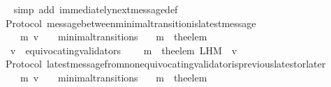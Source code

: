 \begin{isabellebody}
\ \ \isamarkupfalse%
\ {\isacharparenleft}simp\ add{\isacharcolon}\ immediately{\isacharunderscore}next{\isacharunderscore}message{\isacharunderscore}def{\isacharparenright}\ \ \isanewline
\ \ \isamarkupfalse%
%
\endisatagproof
{\isafoldproof}%
%
\isadelimproof
\isanewline
%
\endisadelimproof
\isanewline
\isanewline
{}\isamarkupfalse%
\ {\isacharparenleft}\ Protocol{\isacharparenright}\ message{\isacharunderscore}between{\isacharunderscore}minimal{\isacharunderscore}transition{\isacharunderscore}is{\isacharunderscore}latest{\isacharunderscore}message\ {\isacharcolon}\isanewline
\ \ {\isachardoublequoteopen}{\isasymforall}\ {\isasymsigma}\ {\isasymsigma}{\isacharprime}\ m{\isacharprime}\ v{\isachardot}\ {\isacharparenleft}{\isasymsigma}{\isacharcomma}\ {\isasymsigma}{\isacharprime}{\isacharparenright}\ {\isasymin}\ minimal{\isacharunderscore}transitions\isanewline
\ \ {\isasymlongrightarrow}\ m{\isacharprime}\ {\isacharequal}\ the{\isacharunderscore}elem\ {\isacharparenleft}{\isasymsigma}{\isacharprime}\ {\isacharminus}\ {\isasymsigma}{\isacharparenright}\isanewline
\ \ {\isasymlongrightarrow}\ v\ {\isasymnotin}\ equivocating{\isacharunderscore}validators\ {\isasymsigma}{\isacharprime}\isanewline
\ \ {\isasymlongrightarrow}\ m{\isacharprime}\ {\isacharequal}\ the{\isacharunderscore}elem\ {\isacharparenleft}L{\isacharunderscore}H{\isacharunderscore}M\ {\isasymsigma}{\isacharprime}\ v{\isacharparenright}{\isachardoublequoteclose}\isanewline
%
\isadelimproof
\ \ %
\endisadelimproof
%
\isatagproof
{}\isamarkupfalse%
%
\endisatagproof
{\isafoldproof}%
%
\isadelimproof
\isanewline
%
\endisadelimproof
\isanewline
\isanewline
{}\isamarkupfalse%
\ {\isacharparenleft}\ Protocol{\isacharparenright}\ latest{\isacharunderscore}message{\isacharunderscore}from{\isacharunderscore}non{\isacharunderscore}equivocating{\isacharunderscore}validator{\isacharunderscore}is{\isacharunderscore}previous{\isacharunderscore}latest{\isacharunderscore}or{\isacharunderscore}later{\isacharcolon}\isanewline
\ \ {\isachardoublequoteopen}{\isasymforall}\ {\isasymsigma}\ {\isasymsigma}{\isacharprime}\ m{\isacharprime}\ v{\isachardot}\ {\isacharparenleft}{\isasymsigma}{\isacharcomma}\ {\isasymsigma}{\isacharprime}{\isacharparenright}\ {\isasymin}\ minimal{\isacharunderscore}transitions\isanewline
\ \ {\isasymlongrightarrow}\ m{\isacharprime}\ {\isacharequal}\ the{\isacharunderscore}elem\ {\isacharparenleft}{\isasymsigma}{\isacharprime}\ {\isacharminus}\ {\isasymsigma}{\isacharparenright}\isanewline

\end{isabellebody}
